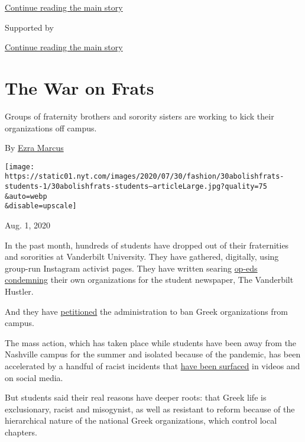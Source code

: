 \protect\hyperlink{after-top}{Continue reading the main story}

Supported by

\protect\hyperlink{after-sponsor}{Continue reading the main story}

\hypertarget{the-war-on-frats}{%
\section{The War on Frats}\label{the-war-on-frats}}

Groups of fraternity brothers and sorority sisters are working to kick
their organizations off campus.

By \href{https://www.nytimes.com/by/ezra-marcus}{Ezra Marcus}

\texttt{[image: https://static01.nyt.com/images/2020/07/30/fashion/30abolishfrats-students-1/30abolishfrats-students--articleLarge.jpg?quality=75\\\&auto=webp\\\&disable=upscale]}

Aug. 1, 2020

In the past month, hundreds of students have dropped out of their
fraternities and sororities at Vanderbilt University. They have
gathered, digitally, using group-run Instagram activist pages. They have
written searing
\href{https://vanderbilthustler.com/33211/featured/schulman-drop/}{op-eds}
\href{https://vanderbilthustler.com/33241/featured/guest-editorial-a-message-from-the-former-brothers-of-delta-tau-delta/}{condemning}
their own organizations for the student newspaper, The Vanderbilt
Hustler.

And they have
\href{https://www.change.org/p/vanderbilt-university-abolish-ifc-and-panhellenic-organizations-at-vanderbilt-university?utm_content=cl_sharecopy_23388057_en-US\%3A6\&recruiter=316950555\&recruited_by_id=962f0bd0-1382-11e5-9061-9518c3aa4d04\&utm_source=share_petitio}{petitioned}
the administration to ban Greek organizations from campus.

The mass action, which has taken place while students have been away
from the Nashville campus for the summer and isolated because of the
pandemic, has been accelerated by a handful of racist incidents that
\href{https://news.vanderbilt.edu/2020/07/07/vanderbilt-university-statement-on-greek-life/}{have
been surfaced} in videos and on social media.

But students said their real reasons have deeper roots: that Greek life
is exclusionary, racist and misogynist, as well as resistant to reform
because of the hierarchical nature of the national Greek organizations,
which control local chapters.


